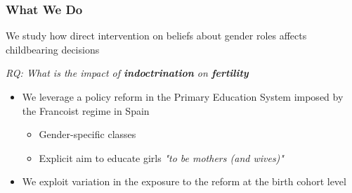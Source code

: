 \documentclass[aspectratio=169]{beamer}
\begin{document}
\begin{frame}
\frametitle{What We Do}

We study how direct intervention on  beliefs about gender roles affects childbearing decisions


\medskip
\centering
\downarrow

\begin{center}
    \textit{RQ: What is the impact of \textbf{indoctrination} on \textbf{fertility}}

\end{center}
\begin{itemize}
    
 \item We leverage a policy reform in the Primary Education System imposed by the Francoist regime in Spain
 \begin{itemize}
 
\medskip
     \item Gender-specific classes
          \medskip

     \item Explicit aim to educate girls \textit{"to be mothers (and wives)"} 
 \end{itemize}

          \medskip

 \item We exploit variation in the exposure to the reform at the birth cohort level 
           \medskip
%
\end{itemize}
 
\end{frame}
\end{document}
